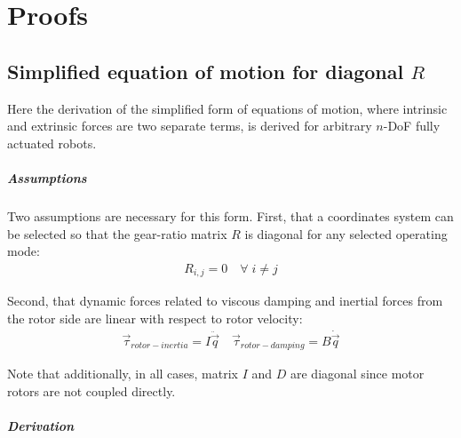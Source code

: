 \chapter{Proofs}
\label{sec:proofs}


\section{Simplified equation of motion for diagonal $R$}
\label{sec:Rdiagndof}

Here the derivation of the simplified form of equations of motion, where intrinsic and extrinsic forces are two separate terms, is derived for arbitrary $n$-DoF fully actuated robots.

\paragraph{Assumptions} 

Two assumptions are necessary for this form. First, that a coordinates system can be selected so that the gear-ratio matrix $R$ is diagonal for any selected operating mode:
%
\begin{align}
R_{i,j} = 0 \quad \forall \; i \neq j
\end{align}
%

Second, that dynamic forces related to viscous damping and inertial forces from the rotor side are linear with respect to rotor velocity:
%
\begin{align}
\vec{\tau}_{rotor-inertia} = I \ddot{\vec{q}}  \quad  \vec{\tau}_{rotor-damping} = B \dot{\vec{q}}
\end{align}
%

Note that additionally, in all cases, matrix $I$ and $D$ are diagonal since motor rotors are not coupled directly. 

\paragraph{Derivation}

